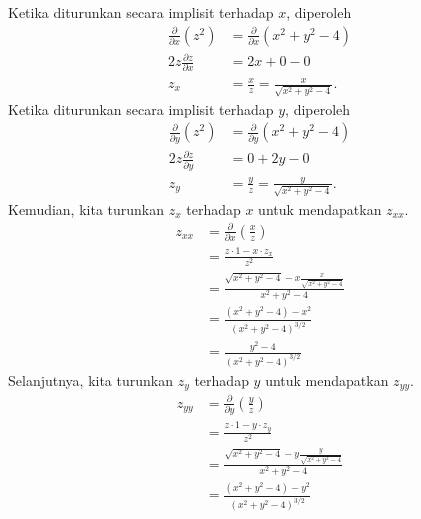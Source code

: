 \documentclass[11pt,a4paper]{article}
\begin{document}
\begin{enumerate}
        Ketika diturunkan secara implisit terhadap $x$, diperoleh
        \begin{align*}
          \frac{\partial}{\partial x}(z^2) & = \frac{\partial}{\partial x}(x^2 + y^2 - 4)  \\
          2z \frac{\partial z}{\partial x} & = 2x + 0 - 0                                  \\
          z_x                              & = \frac{x}{z}=\frac{x}{\sqrt{x^2 + y^2 - 4}}.
        \end{align*}
        Ketika diturunkan secara implisit terhadap $y$, diperoleh
        \begin{align*}
          \frac{\partial}{\partial y}(z^2) & = \frac{\partial}{\partial y}(x^2 + y^2 - 4)  \\
          2z \frac{\partial z}{\partial y} & = 0 + 2y - 0                                  \\
          z_y                              & = \frac{y}{z}=\frac{y}{\sqrt{x^2 + y^2 - 4}}.
        \end{align*}
        Kemudian, kita turunkan $z_x$ terhadap $x$ untuk mendapatkan $z_{xx}$.
        \begin{align*}
          z_{xx} & = \frac{\partial}{\partial x}\left(\frac{x}{z}\right)                            \\
                 & = \frac{z \cdot 1 - x \cdot z_x}{z^2}                                            \\
                 & = \frac{\sqrt{x^2 + y^2 - 4}  - x \frac{x}{\sqrt{x^2 + y^2 - 4}}}{x^2 + y^2 - 4} \\
                 & = \frac{(x^2 + y^2 - 4) - x^2}{(x^2 + y^2 - 4)^{3/2}}                            \\
                 & = \frac{y^2 - 4}{(x^2 + y^2 - 4)^{3/2}}
        \end{align*}
        Selanjutnya, kita turunkan $z_y$ terhadap $y$ untuk mendapatkan $z_{yy}$.
        \begin{align*}
          z_{yy} & = \frac{\partial}{\partial y}\left(\frac{y}{z}\right)                            \\
                 & = \frac{z \cdot 1 - y \cdot z_y}{z^2}                                            \\
                 & = \frac{\sqrt{x^2 + y^2 - 4}  - y \frac{y}{\sqrt{x^2 + y^2 - 4}}}{x^2 + y^2 - 4} \\
                 & = \frac{(x^2 + y^2 - 4) - y^2}{(x^2 + y^2 - 4)^{3/2}}                            \\

\end{align*}
\end{enumerate}
\end{document}
